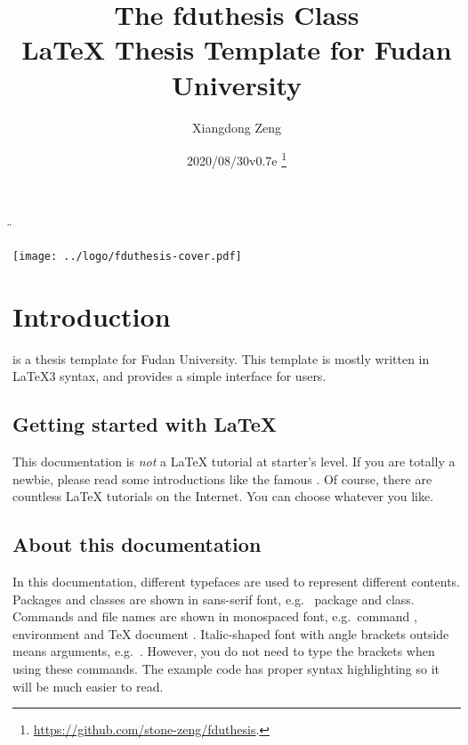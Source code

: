 \documentclass{fdudoc}
\title{\textcolor{MaterialIndigo800}{%
  \textbf{The \textsf{fduthesis} Class \\
    \LaTeX{} Thesis Template for Fudan University}}}
\author{Xiangdong Zeng}
\date{2020/08/30\quad v0.7e%
  \thanks{\url{https://github.com/stone-zeng/fduthesis}.}}
\begin{document}
\DeleteShortVerb\"


\maketitle
\vfill
\begin{center}
  \texttt{[image: ../logo/fduthesis-cover.pdf]}
\end{center}
\vfill
\thispagestyle{plain}
\clearpage

\tableofcontents


\section{Introduction}

 is a thesis template for Fudan University.
This template is mostly written in \LaTeX3 syntax, and
provides a simple interface for users.

\subsection*{Getting started with \LaTeX{}}

This documentation is \emph{not} a \LaTeX{} tutorial at
starter's level. If you are totally a newbie, please read some
introductions like the famous . Of course, there
are countless \LaTeX{} tutorials on the Internet. You can
choose whatever you like.

\subsection*{About this documentation}

In this documentation, different typefaces are used to
represent different contents. Packages and classes are shown
in sans-serif font, e.g.\  package and
 class. Commands and file names are shown in
monospaced font, e.g.\ command , environment
 and \TeX{} document .
Italic-shaped font with angle brackets outside means arguments,
e.g.\ . However, you do not need to type
the brackets when using these commands. The example code has
proper syntax highlighting so it will be much easier to read.
\end{document}
